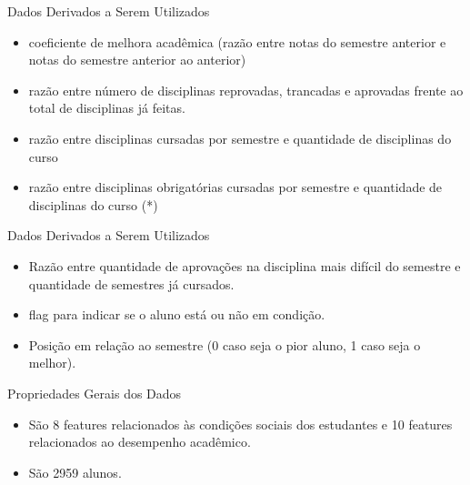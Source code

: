 \begin{frame}{Dados Derivados a Serem Utilizados}
    \begin{itemize}[itemsep=3ex]
        \item coeficiente de melhora acadêmica (razão entre notas do semestre
            anterior e notas do semestre anterior ao anterior) 
        \item razão entre número de disciplinas reprovadas, trancadas e 
            aprovadas frente ao total de disciplinas já feitas. 
        \item razão entre disciplinas cursadas por semestre e quantidade 
            de disciplinas do curso 
        \item razão entre disciplinas obrigatórias cursadas por semestre e quantidade 
            de disciplinas do curso (*)
    \end{itemize}
\end{frame}

\begin{frame}{Dados Derivados a Serem Utilizados}
    \begin{itemize}[itemsep=3ex]
        \item Razão entre quantidade de aprovações na disciplina mais difícil do
            semestre e quantidade de semestres já cursados.
        \item flag para indicar se o aluno está ou não em condição.
        \item Posição em relação ao semestre (0 caso seja o pior aluno, 1 caso seja o
            melhor).
    \end{itemize}
\end{frame}

\begin{frame}{Propriedades Gerais dos Dados}
    \begin{itemize}[itemsep=3ex]
        \item São 8 features relacionados às condições sociais dos estudantes e 10
            features relacionados ao desempenho acadêmico.
        \item São 2959 alunos.  
    \end{itemize}
\end{frame}


